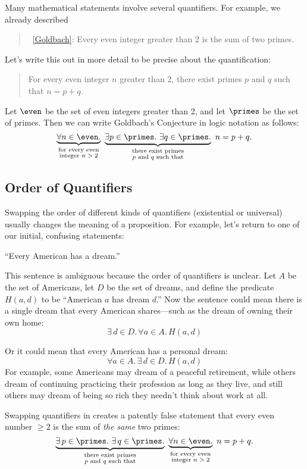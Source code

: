 Many mathematical statements involve several quantifiers.  For
example, we already described
\begin{quote}
 ~\ref{Goldbach}: Every even integer
 greater than 2 is the sum of two primes.
\end{quote}
Let's write this out in more detail to be precise about the
quantification:
\begin{quote}
For every even integer $n$ greater than 2,
there exist primes $p$ and $q$ such that $n = p + q$.
\end{quote}
Let $\even$ be the set of even integers greater than 2, and let $\primes$ be the
set of primes.  Then we can write Goldbach's Conjecture in logic
notation as follows:
\[
\underbrace{\forall n \in \even.}_{\substack
    {\text{for every even} \\
     \text{integer $n > 2$}}}
\
\underbrace{\exists p \in \primes.\ \exists q \in \primes.}_{\substack
    {\text{there exist primes} \\
     \text{$p$ and $q$ such that}}}
\ n = p + q.
\]

\subsection{Order of Quantifiers}

Swapping the order of different kinds of quantifiers (existential or
universal) usually changes the meaning of a proposition.  For example,
let's return to one of our initial, confusing statements:
\begin{center}
``Every American has a dream.''
\end{center}

This sentence is ambiguous because the order of quantifiers is
unclear.  Let $A$ be the set of Americans, let $D$ be the set of
dreams, and define the predicate $H(a, d)$ to be ``American $a$ has
dream $d$.''  Now the sentence could mean there is a single dream
that every American shares---such as the dream of owning their own
home:
\[
\exists\, d \in D.\, \forall a \in A.\, H(a, d)
\]

Or it could mean that every American has a personal dream:
\[
\forall a \in A.\, \exists\, d \in D.\, H(a, d)
\]
For example, some Americans may dream of a peaceful retirement, while
others dream of continuing practicing their profession as long as they
live, and still others may dream of being so rich they needn't think
about work at all.

Swapping quantifiers in  creates a patently false
statement that every even number $\geq 2$ is the sum of \emph{the same}
two primes:
\[
\underbrace{\exists\, p \in \primes.\ \exists\, q \in \primes.}_{\substack
    {\text{there exist primes} \\
     \text{$p$ and $q$ such that}}}
\
\underbrace{\forall n \in \even.}_{\substack
    {\text{for every even} \\
     \text{integer $n > 2$}}}
\ n = p + q.
\]

